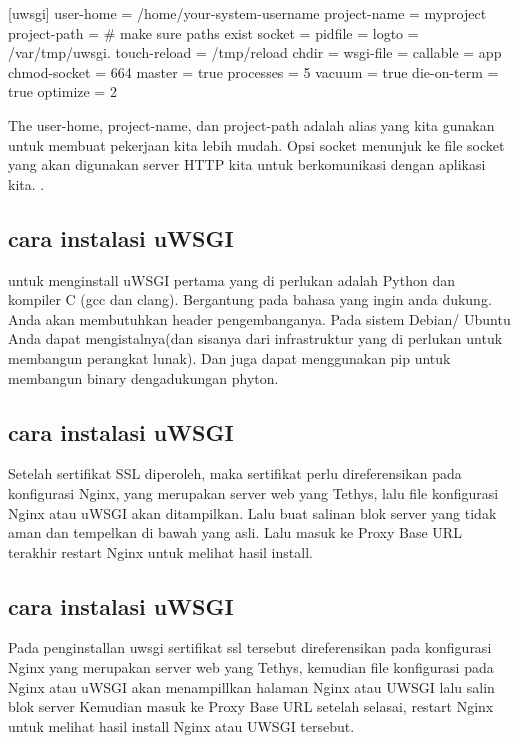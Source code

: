 [uwsgi] 
user-home = /home/your-system-username 
project-name = myproject
project-path = %
# make sure paths exist 
socket = %
pidfile = %
logto = /var/tmp/uwsgi.%
touch-reload = /tmp/reload 
chdir = %
wsgi-file = %
callable = app 
chmod-socket = 664 
master = true 
processes = 5 
vacuum = true 
die-on-term = true 
optimize = 2

The user-home, project-name, dan project-path adalah alias yang kita gunakan untuk membuat pekerjaan kita lebih mudah. Opsi socket menunjuk ke file socket yang akan digunakan server HTTP kita untuk berkomunikasi dengan aplikasi kita. \cite{maia2015building}.

\subsection{cara instalasi uWSGI}
untuk menginstall uWSGI pertama yang di perlukan adalah Python dan kompiler C (gcc dan clang). Bergantung pada bahasa yang ingin anda dukung. Anda akan membutuhkan header pengembanganya. Pada sistem Debian/ Ubuntu Anda dapat mengistalnya(dan sisanya dari infrastruktur yang di perlukan untuk membangun perangkat lunak). Dan juga dapat menggunakan pip untuk membangun binary dengadukungan phyton\cite{berger2017usage}.

\subsection {cara instalasi uWSGI}
Setelah sertifikat SSL diperoleh, maka sertifikat perlu direferensikan pada konfigurasi Nginx, yang merupakan server web yang Tethys, lalu file konfigurasi Nginx atau uWSGI akan ditampilkan. Lalu buat salinan blok server yang tidak aman dan tempelkan di bawah yang asli. Lalu masuk ke Proxy Base URL terakhir restart Nginx untuk melihat hasil install\cite{swain2018tethys}.

\subsection {cara instalasi uWSGI}
Pada penginstallan uwsgi sertifikat ssl tersebut direferensikan pada konfigurasi Nginx yang merupakan server web yang Tethys, kemudian file konfigurasi pada Nginx atau uWSGI akan menampillkan halaman Nginx atau UWSGI lalu salin blok server Kemudian masuk ke Proxy Base URL setelah selasai, restart Nginx untuk melihat hasil install Nginx atau UWSGI tersebut\cite{pellicer2016desarrollo}.


